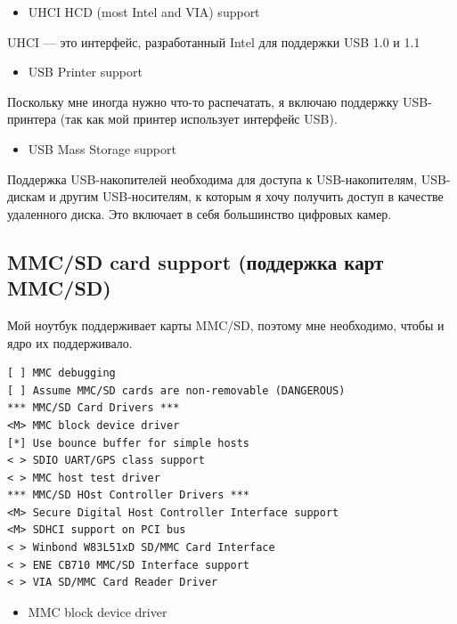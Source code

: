 \documentclass[10pt]{book}
\begin{document}
\begin{itemize}
\item UHCI HCD (most Intel and VIA) support
\end{itemize}

UHCI — это интерфейс, разработанный Intel для поддержки USB 1.0 и 1.1

\begin{itemize}
\item USB Printer support
\end{itemize}

Поскольку мне иногда нужно что-то распечатать, я включаю поддержку USB-принтера (так как мой принтер использует интерфейс USB).

\begin{itemize}
\item USB Mass Storage support
\end{itemize}

Поддержка USB-накопителей необходима для доступа к USB-накопителям, USB-дискам и другим USB-носителям, к которым я хочу получить доступ в качестве удаленного диска. Это включает в себя большинство цифровых камер.

\subsection{MMC/SD card support (поддержка карт MMC/SD)}

Мой ноутбук поддерживает карты MMC/SD, поэтому мне необходимо, чтобы и ядро их поддерживало.

\vspace{3mm}
\begin{tcolorbox}[colback=gray!14!white, colframe=blue!75!blue]
\begin{lstlisting}
[ ] MMC debugging
[ ] Assume MMC/SD cards are non-removable (DANGEROUS)
*** MMC/SD Card Drivers ***
<M> MMC block device driver
[*] Use bounce buffer for simple hosts
< > SDIO UART/GPS class support
< > MMC host test driver
*** MMC/SD HOst Controller Drivers ***
<M> Secure Digital Host Controller Interface support
<M> SDHCI support on PCI bus
< > Winbond W83L51xD SD/MMC Card Interface
< > ENE CB710 MMC/SD Interface support
< > VIA SD/MMC Card Reader Driver
\end{lstlisting}
\end{tcolorbox}

\begin{itemize}
\item MMC block device driver
\end{itemize}
\end{document}
